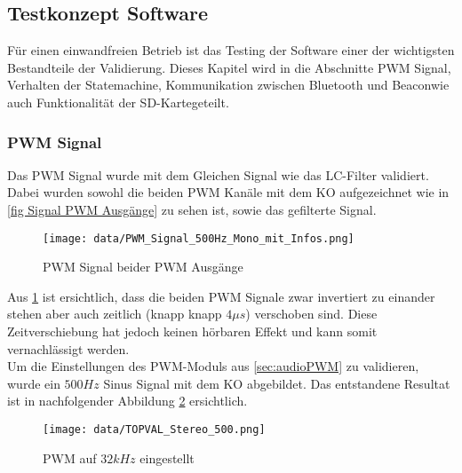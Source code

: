 \subsection{Testkonzept Software}\label{sec:testkonzeptSoftware}

Für einen einwandfreien Betrieb ist das Testing der Software einer der wichtigsten Bestandteile der Validierung. Dieses Kapitel wird in die Abschnitte \glqq PWM Signal\grqq, \glqq Verhalten der Statemachine\grqq, \glqq Kommunikation zwischen Bluetooth und Beacon\grqq wie auch \glqq Funktionalität der SD-Karte\grqq geteilt.

\subsubsection{PWM Signal}\label{sec: Validierung PWM Signal}

Das PWM Signal wurde mit dem Gleichen Signal wie das LC-Filter validiert. Dabei wurden sowohl die beiden PWM Kanäle mit dem KO aufgezeichnet wie in \ref{fig Signal PWM Ausgänge} zu sehen ist, sowie das gefilterte Signal. 

\begin{figure}[H]
	\begin{center}
		\texttt{[image: data/PWM\_Signal\_500Hz\_Mono\_mit\_Infos.png]}
		\caption[PWM Signal beider PWM Ausgänge]{PWM Signal beider PWM Ausgänge} %
		\label{fig:Signal PWM Ausgänge}
	\end{center}
\end{figure}


Aus \ref{fig:Signal PWM Ausgänge} ist ersichtlich, dass die beiden PWM Signale zwar invertiert zu einander stehen aber auch zeitlich (knapp knapp $4\mu s$) verschoben sind. Diese Zeitverschiebung hat jedoch keinen hörbaren Effekt und kann somit vernachlässigt werden.\\
Um die Einstellungen des PWM-Moduls aus \ref{sec:audioPWM} zu validieren, wurde ein $500Hz$ Sinus Signal mit dem KO abgebildet. Das entstandene Resultat ist in nachfolgender Abbildung \ref{fig:PWM Topval 500 Stereo} ersichtlich.

\begin{figure}[H]
	\begin{center}
		\texttt{[image: data/TOPVAL\_Stereo\_500.png]}
		\caption[PWM auf $32kHz$ eingestellt]{PWM auf $32kHz$ eingestellt} %
		\label{fig:PWM Topval 500 Stereo}
	\end{center}
\end{figure}


